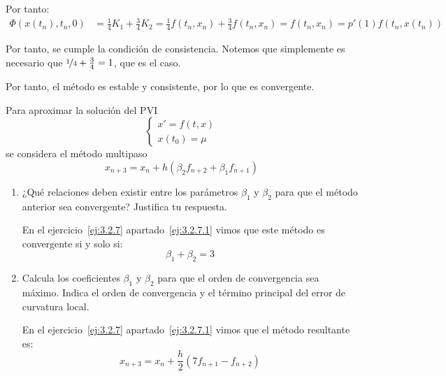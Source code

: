 \begin{ejercicio}[DGIIM 2023/24]
\begin{itemize}
        Por tanto:
        \begin{align*}
            \Phi(x(t_n), t_n, 0) &= \frac{1}{4}K_1 + \frac{3}{4}K_2 = \frac{1}{4}f(t_n, x_n) + \frac{3}{4}f(t_n, x_n) = f(t_n, x_n) = p'(1)f(t_n, x(t_n))
        \end{align*}

        Por tanto, se cumple la condición de consistencia. Notemos que simplemente es necesario que $\nicefrac{1}{4} + \frac{3}{4} = 1$, que es el caso.
    \end{itemize}

    Por tanto, el método es estable y consistente, por lo que es convergente.
\end{ejercicio}


\begin{ejercicio}[DGIIM 2023/24]
    Para aproximar la solución del PVI
    \begin{equation*}
        \begin{cases}
            x' = f(t, x) \\
            x(t_0) = \mu
        \end{cases}
    \end{equation*}
    se considera el método multipaso
    \begin{equation*}
        x_{n+3} = x_n + h(\beta_2 f_{n+2} + \beta_1 f_{n+1})
    \end{equation*}
    \begin{enumerate}
        \item ¿Qué relaciones deben existir entre los parámetros $\beta_1$ y $\beta_2$ para que el método anterior sea convergente? Justifica tu respuesta.
        
        En el ejercicio~\ref{ej:3.2.7} apartado~\ref{ej:3.2.7.1} vimos que este método es convergente si y solo si:
        \begin{equation*}
            \beta_1 + \beta_2 = 3
        \end{equation*}
        \item Calcula los coeficientes $\beta_1$ y $\beta_2$ para que el orden de convergencia sea máximo. Indica el orden de convergencia y el término principal del error de curvatura local.
        
        En el ejercicio~\ref{ej:3.2.7} apartado~\ref{ej:3.2.7.1} vimos que el método resultante es:
        \begin{equation*}
            x_{n+3} = x_n + \frac{h}{2}\left(7 f_{n+1} - f_{n+2}\right)
        \end{equation*}


\end{enumerate}
\end{ejercicio}
